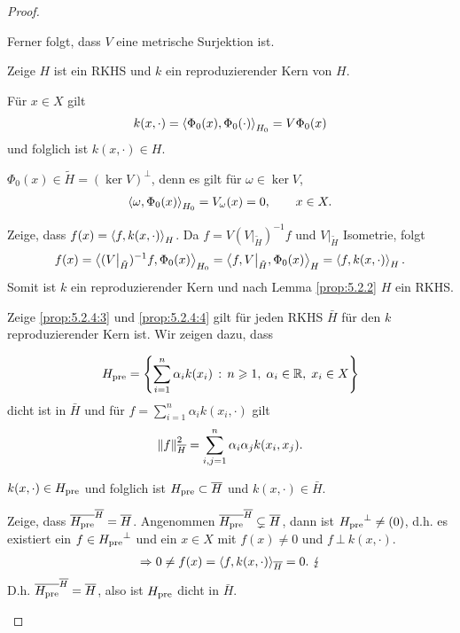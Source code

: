 \begin{proof}
\begin{proofenum}
\begin{proofenuma}
Ferner folgt, dass $V$ eine metrische Surjektion ist.
\end{proofenuma}
\item
Zeige $H$ ist ein RKHS und $k$ ein reproduzierender Kern von $H$.
\begin{proofenuma}
\item Für $x\in X$ gilt
\begin{align*}
k(x,\cdot) = \left\langle\Phi_0(x),\Phi_0(\cdot)\right\rangle_{H_0} = V\Phi_0(x)
\end{align*}
und folglich ist $k(x,\cdot)\in H$.
\item $\Phi_0(x)\in \tilde{H} = (\ker V)^\bot$, denn es gilt für $\omega\in \ker
V$,
\begin{align*}
\left\langle\omega, \Phi_0(x)\right\rangle_{H_0} = V_\omega(x) = 0,\qquad x\in X.
\end{align*}
\item Zeige, dass $f(x)= \left\langle f,k(x,\cdot)\right\rangle_H$. Da $f =
V(V\big|_{\tilde{H}})^{-1}f$ und $V\big|_{\tilde{H}}$ Isometrie, folgt
\begin{align*}
f(x) = \left\langle(V\big|_{\tilde{H}})^{-1}f,\Phi_0(x)\right\rangle_{H_0} = 
\left\langle f,V\big|_{\tilde{H}},\Phi_0(x)\right\rangle_H = \left\langle f, k(x,\cdot)\right\rangle_H.
\end{align*}
Somit ist $k$ ein reproduzierender Kern und nach Lemma \ref{prop:5.2.2} $H$ ein
RKHS.
\end{proofenuma}
\item Zeige \ref{prop:5.2.4:3} und \ref{prop:5.2.4:4} gilt für jeden RKHS
$\bar{H}$ für den $k$ reproduzierender Kern ist. Wir zeigen dazu, dass

\begin{align*}
H_{\mathrm{pre}} = \left\{ \sum_{i=1}^n \alpha_i k(x_i)\,:\,n\geqslant 1,\; \alpha_i\in\mathbb{R},\;
x_i\in X\right\}
\end{align*}
dicht ist in $\bar{H}$ und für $f = \sum_{i=1}^n \alpha_i k(x_i,\cdot)$ gilt
\begin{align*}
\left\|f\right\|_{{\overline{H}}}^2 = \sum_{i,j=1}^n \alpha_i \alpha_j k(x_i,x_j).
\end{align*}
\begin{proofenuma}
\item $k(x,\cdot) \in H_{\mathrm{pre}}$ und folglich ist $H_{\mathrm{pre}} \subset {\overline{H}}$ und
$k(x,\cdot)\in \bar{H}$.
\item Zeige, dass ${\overline{H_{\mathrm{pre}}}}^{{\overline{H}}} = {\overline{H}}$. Angenommen
${\overline{H_{\mathrm{pre}}}}^{{\overline{H}}} \subsetneq {\overline{H}}$, dann ist ${H_{\mathrm{pre}}}^\bot \neq (0)$,
d.h. es existiert ein $f\in {H_{\mathrm{pre}}}^\bot$ und ein $x\in X$ mit $f(x)\neq 0$
und $f\ \bot\  k(x,\cdot)$.
\begin{align*}
\Rightarrow 0 \neq f(x) = \left\langle f,k(x,\cdot)\right\rangle_{{\overline{H}}} = 0.\ \lightning 
\end{align*}
D.h. ${\overline{H_{\mathrm{pre}}}}^{\overline{H}}={\overline{H}}$, also ist $H_{\mathrm{pre}}$ dicht in $\bar{H}$.


\end{proofenuma}
\end{proofenum}
\end{proof}
